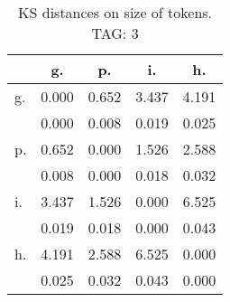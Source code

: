\begin{table}[h!]
\begin{center}
\begin{tabular}{| l | c | c | c | c |}\hline
 & g. & p. & i. & h. \\\hline
g. & 0.000  & 0.652  & 3.437  & 4.191 \\\hline
 & 0.000  & 0.008  & 0.019  & 0.025 \\\hline
p. & 0.652  & 0.000  & 1.526  & 2.588 \\\hline
 & 0.008  & 0.000  & 0.018  & 0.032 \\\hline
i. & 3.437  & 1.526  & 0.000  & 6.525 \\\hline
 & 0.019  & 0.018  & 0.000  & 0.043 \\\hline
h. & 4.191  & 2.588  & 6.525  & 0.000 \\\hline
 & 0.025  & 0.032  & 0.043  & 0.000 \\\hline
\end{tabular}
\caption{KS distances on size of tokens. TAG: 3}
\end{center}
\end{table}